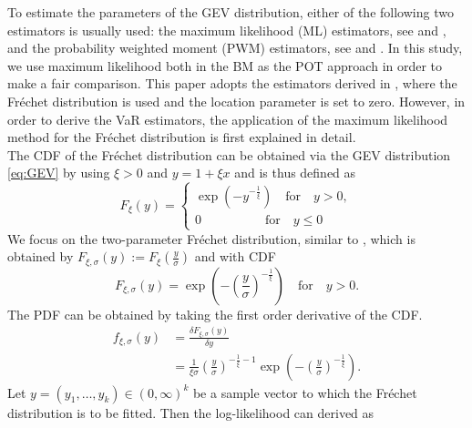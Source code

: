 \documentclass[a4paper,12pt]{article}
\theoremstyle{plain}
\begin{document}
To estimate the parameters of the GEV distribution, either of the following two estimators is usually used: the maximum likelihood (ML) estimators, see  and , and the probability weighted moment (PWM) estimators, see  and . In this study, we use maximum likelihood both in the BM as the POT approach in order to make a fair comparison. This paper adopts the estimators derived in , where the Fr\'echet distribution is used and the location parameter is set to zero. However, in order to derive the VaR estimators, the application of the maximum likelihood method for the Fr\'echet distribution is first explained in detail. \\

The CDF of the Fr\'echet distribution can be obtained via the GEV distribution \eqref{eq:GEV} by using $\xi>0$ and $y=1+\xi x$ and is thus defined as 
\begin{equation}
    F_{\xi}(y) = \begin{cases}
               \exp{\left(-y^{-\frac{1}{\xi}}\right)} \quad \textrm{for} \quad y > 0,\\
              0 \quad\quad\quad\quad\quad \textrm{for} \quad y\leq0
            \end{cases}
\label{eq:frechet}
\end{equation}
We focus on the two-parameter Fr\'echet distribution, similar to , which is obtained by $F_{\xi, \sigma}\left(y\right):=F_{\xi}\left(\frac{y}{\sigma}\right)$ and with CDF
\begin{equation}
    F_{\xi, \sigma}\left(y\right) = \exp{\left(-\left(\frac{y}{\sigma}\right)^{-\frac{1}{\xi}}\right)} \quad \textrm{for} \quad y > 0.
    \label{eq:frechetcdf}
\end{equation}
The PDF can be obtained by taking the first order derivative of the CDF.
\begin{equation}
    \begin{split}
    f_{\xi, \sigma}\left(y\right) &= \frac{\delta F_{\xi, \sigma}(y)}{\delta y} \\
    &= \frac{1}{\xi\sigma}\left(\frac{y}{\sigma}\right)^{-\frac{1}{\xi} -1}\exp{\left(-\left(\frac{y}{\sigma}\right)^{-\frac{1}{\xi}}\right)}.
    \end{split}
    \label{eq:gevpdf}
\end{equation}
Let $y=\left(y_1,\dots,y_k\right)\in \left(0, \infty\right)^k$ be a sample vector to which the Fr\'echet distribution is to be fitted. Then the log-likelihood can derived as
\end{document}
